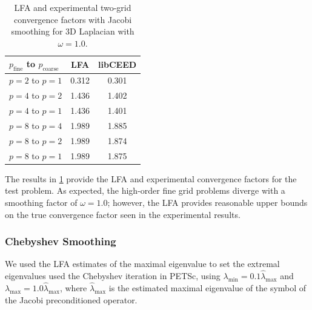 \documentclass[review]{siamart190516}
\begin{document}
\begin{table}[ht!]
\begin{center}
\begin{tabular}{l c c}
  \toprule
  $p_{\text{fine}}$ to $p_{\text{coarse}}$  &  LFA  &  libCEED  \\
  \toprule
  $p = 2$ to $p = 1$   &  0.312  &  0.301  \\
  \midrule
  $p = 4$ to $p = 2$   &  1.436  &  1.402  \\
  $p = 4$ to $p = 1$   &  1.436  &  1.401  \\
  \midrule
  $p = 8$ to $p = 4$   &  1.989  &  1.885  \\
  $p = 8$ to $p = 2$   &  1.989  &  1.874  \\
  $p = 8$ to $p = 1$   &  1.989  &  1.875  \\
  \bottomrule
\end{tabular}
\end{center}
\caption{LFA and experimental two-grid convergence factors with Jacobi smoothing for 3D Laplacian with $\omega = 1.0$.}
\label{table:two_grid_3d_jacobi}
\end{table}

The results in \cref{table:two_grid_3d_jacobi} provide the LFA and experimental convergence factors for the test problem.
As expected, the high-order fine grid problems diverge with a smoothing factor of $\omega = 1.0$; however, the LFA provides reasonable upper bounds on the true convergence factor seen in the experimental results.

\subsubsection{Chebyshev Smoothing}

We used the LFA estimates of the maximal eigenvalue to set the extremal eigenvalues used the Chebyshev iteration in PETSc, using $\lambda_{\text{min}} = 0.1 \hat{\lambda}_{\text{max}}$ and $\lambda_{\text{max}} = 1.0 \hat{\lambda}_{\text{max}}$, where $\hat{\lambda}_{\text{max}}$ is the estimated maximal eigenvalue of the symbol of the Jacobi preconditioned operator.
\end{document}
